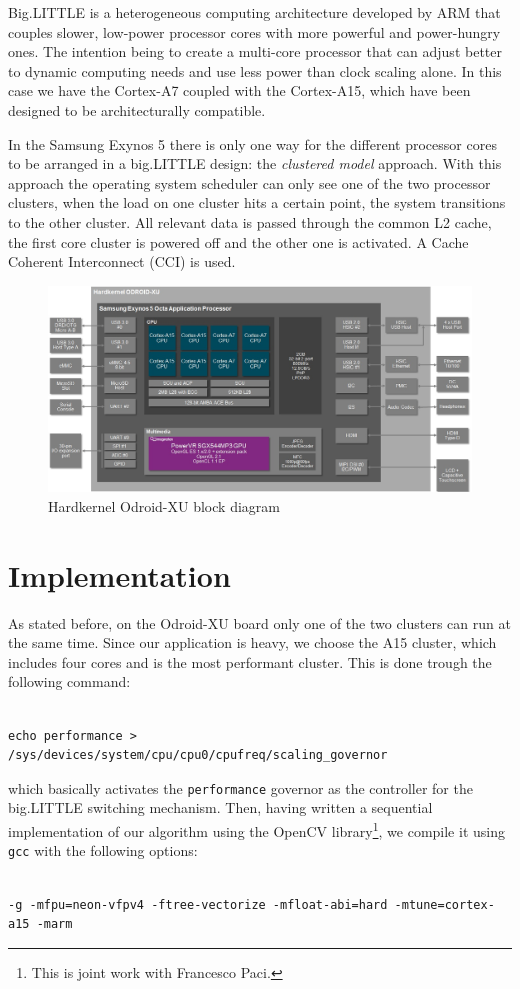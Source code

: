 Big.LITTLE is a heterogeneous computing architecture developed by ARM that couples slower, low-power processor cores with more powerful and power-hungry ones. The intention being to create a multi-core processor that can adjust better to dynamic computing needs and use less power than clock scaling alone. In this case we have the Cortex-A7 coupled with the Cortex-A15, which have been designed to be architecturally compatible.

In the Samsung Exynos 5 there is only one way for the different processor cores to be arranged in a big.LITTLE design: the \textit{clustered model} approach. With this approach the operating system scheduler can only see one of the two processor clusters, when the load on one cluster hits a certain point, the system transitions to the other cluster. All relevant data is passed through the common L2 cache, the first core cluster is powered off and the other one is activated. A Cache Coherent Interconnect (CCI) is used.




\begin{figure}[t!]
\centering
\includegraphics[width=0.9\linewidth]{Figures/Hardkernel-ODROID-XU-block_diagram.jpg}
\caption{Hardkernel Odroid-XU block diagram}
\label{odroid-xu}
\end{figure}

\section{Implementation}
\lstset{language=C++}

As stated before, on the Odroid-XU board only one of the two clusters can run at the same time. Since our application is heavy, we choose the A15 cluster, which includes four cores and is the most performant cluster. This is done trough the following command:
\begin{lstlisting}[frame=single]  % Start your code-block

echo performance > /sys/devices/system/cpu/cpu0/cpufreq/scaling_governor
\end{lstlisting}
which basically activates the \verb+performance+ governor as the controller for the big.LITTLE switching mechanism.
Then, having written a sequential implementation of our algorithm using the OpenCV library\footnote{This is joint work with Francesco Paci.}, we compile it using \verb+gcc+ with the following options:
\begin{lstlisting}[frame=single]  % Start your code-block

-g -mfpu=neon-vfpv4 -ftree-vectorize -mfloat-abi=hard -mtune=cortex-a15 -marm
\end{lstlisting}

